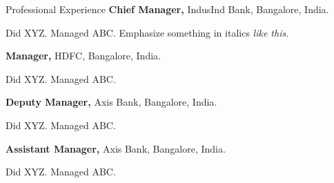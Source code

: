 \begin{rubric}{Professional Experience}
%
	\textbf{Chief Manager,} IndusInd Bank, Bangalore, India. 
    \par Did XYZ. Managed ABC. Emphasize something in italics \textit{like this}.
% 
%

%
	\textbf{Manager,} HDFC, Bangalore, India. 
    \par Did XYZ. Managed ABC.

%
	\textbf{Deputy Manager,} Axis Bank, Bangalore, India. 
    \par Did XYZ. Managed ABC.

%
	\textbf{Assistant Manager,} Axis Bank, Bangalore, India. 
    \par Did XYZ. Managed ABC.
%
\end{rubric}